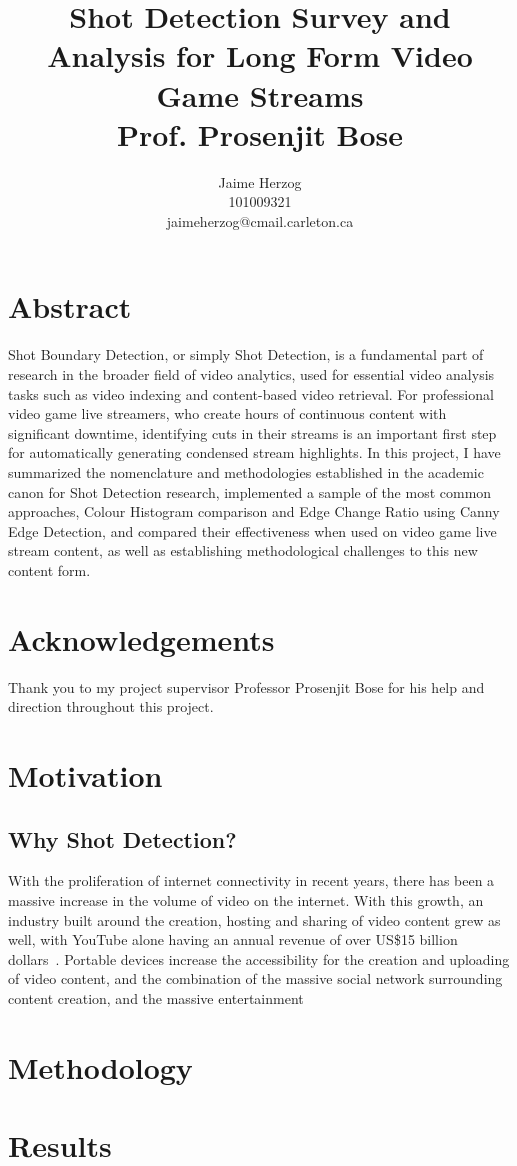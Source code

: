 \documentclass[12pt]{article}
\title{Shot Detection Survey and Analysis for Long Form Video Game Streams \\ Prof. Prosenjit Bose}
\author{Jaime Herzog\\ 101009321 \\ jaimeherzog@cmail.carleton.ca}
\begin{document}
\maketitle
\clearpage

\section{Abstract}
Shot Boundary Detection, or simply Shot Detection, is a fundamental part of research in the broader field of video analytics, used for essential video analysis tasks such as 
video indexing and content-based video retrieval. For professional video game live streamers, who create hours of continuous content with significant downtime, identifying
cuts in their streams is an important first step for automatically generating condensed stream highlights. In this project, I have summarized the nomenclature and methodologies
established in the academic canon for Shot Detection research, implemented a sample of the most common approaches, Colour Histogram comparison and Edge Change Ratio using Canny 
Edge Detection, and compared their effectiveness when used on video game live stream content, as well as establishing methodological challenges to this new content form.
\section{Acknowledgements}
Thank you to my project supervisor Professor Prosenjit Bose for his help and direction throughout this project.
\clearpage

\tableofcontents
\clearpage

\section{Motivation}
\subsection{Why Shot Detection?}
    With the proliferation of internet connectivity in recent years, there has been a massive increase in the volume of video on the internet.
With this growth, an industry built around the creation, hosting and sharing of video content grew as well, with YouTube alone having an annual revenue of over US\$15 billion
dollars~\cite{youtube}. Portable devices increase the accessibility for the creation and uploading of video content, and the combination of the 
massive social network surrounding content creation, and the massive entertainment 



\subsection{}
\clearpage

\section{Methodology}
\blindtext
\clearpage

\section{Results}
\blindtext
\clearpage

{}

\clearpage
\end{document}
